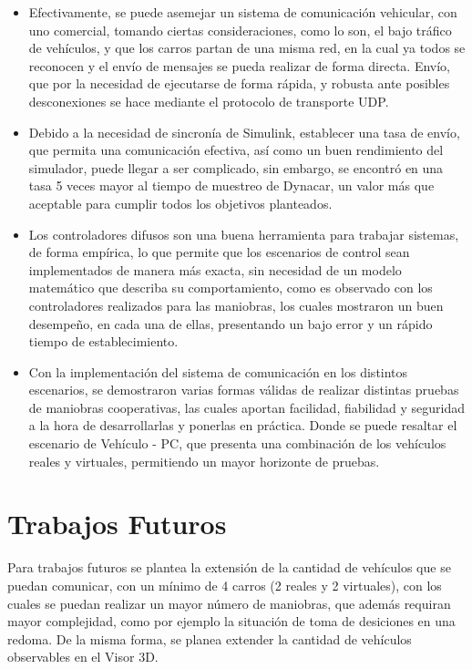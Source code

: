 \begin{itemize}

\item Efectivamente, se puede asemejar un sistema de comunicación vehicular, con uno comercial, tomando ciertas consideraciones, como lo son, el bajo tráfico de vehículos, y que los carros partan de una misma red, en la cual ya todos se reconocen y el envío de mensajes se pueda realizar de forma directa. Envío, que por la necesidad de ejecutarse de forma rápida, y robusta ante posibles desconexiones se hace mediante el protocolo de transporte UDP. 

\item Debido a la necesidad de sincronía de Simulink, establecer una tasa de envío, que permita una comunicación efectiva, así como un buen rendimiento del simulador, puede llegar a ser complicado, sin embargo, se encontró en una tasa 5 veces mayor al tiempo de muestreo de Dynacar, un valor más que aceptable para cumplir todos los objetivos planteados.  

\item Los controladores difusos son una buena herramienta para trabajar sistemas, de forma empírica, lo que permite que los escenarios de control sean implementados de manera más exacta, sin necesidad de un modelo matemático que describa su comportamiento, como es observado con los controladores realizados para las maniobras, los cuales  mostraron un buen desempeño, en cada una de ellas, presentando un bajo error y un rápido tiempo de establecimiento.     

\item Con la implementación del sistema de comunicación en los distintos escenarios, se demostraron varias formas válidas de realizar distintas pruebas de maniobras cooperativas, las cuales aportan facilidad, fiabilidad y seguridad a la hora de desarrollarlas y ponerlas en práctica. Donde se puede resaltar el escenario de Vehículo - PC, que presenta una combinación de los vehículos reales y virtuales, permitiendo un mayor horizonte de pruebas.    
\end{itemize}

\section {Trabajos Futuros}

Para trabajos futuros se plantea la extensión de la cantidad de vehículos que se puedan comunicar, con un mínimo de 4 carros (2 reales y 2 virtuales), con los cuales se puedan realizar un mayor número de maniobras, que además requiran mayor complejidad, como por ejemplo la situación de toma de desiciones en una redoma. De la misma forma, se planea extender la cantidad de vehículos observables en el Visor 3D.\\  

